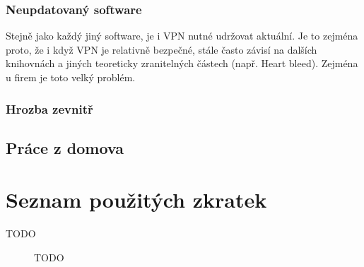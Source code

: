 \documentclass[thesis=B,czech]{FITthesis}[2012/06/26]
\begin{document}
    \subsection{Neupdatovaný software}
      Stejně jako každý jiný software, je i VPN nutné udržovat aktuální. Je to zejména proto, že i když VPN je relativně bezpečné, stále často závisí na dalších knihovnách a jiných teoreticky zranitelných částech (např. Heart bleed). Zejména u firem je toto velký problém.

    \subsection{Hrozba zevnitř}
      

\section{Práce z domova}

\begin{conclusion}

\end{conclusion}




\appendix

\chapter{Seznam použitých zkratek}
\begin{description}

    \item[TODO] TODO

\end{description}
\end{document}
